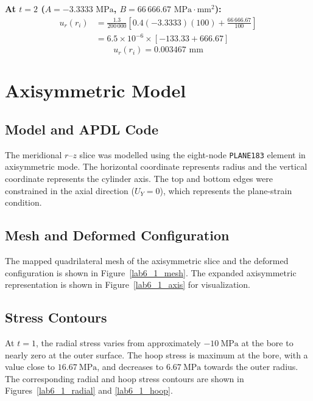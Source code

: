 \textbf{At $t = 2$ ($A = -3.3333\text{ MPa}$, $B = 66\,666.67\text{ MPa}\cdot\text{mm}^2$):}
    \begin{align*}
    u_r(r_i) &= \frac{1.3}{200\,000} \left[ 0.4(-3.3333)(100) + \frac{66\,666.67}{100} \right] \\
             &= 6.5 \times 10^{-6} \times [-133.33 + 666.67] 
    \end{align*}
    \[\boxed{u_r(r_i)  = {0.003467\text{ mm}}}\]

\section{Axisymmetric Model}

\subsection{Model and APDL Code}

The meridional $r$--$z$ slice was modelled using the eight-node
\texttt{PLANE183} element in axisymmetric mode.  The horizontal coordinate
represents radius and the vertical coordinate represents the cylinder axis.
The top and bottom edges were constrained in the axial direction
($U_Y=0$), which represents the plane-strain condition.



\subsection{Mesh and Deformed Configuration}

The mapped quadrilateral mesh of the axisymmetric slice and the deformed configuration is shown in
Figure~\ref{lab6_1_mesh}.  The expanded axisymmetric representation is shown
in Figure~\ref{lab6_1_axis} for visualization.

\subsection{Stress Contours}

At $t=1$, the radial stress varies from approximately
$-\SI{10}{\mega\pascal}$ at the bore to nearly zero at the outer surface.
The hoop stress is maximum at the bore, with a value close to
$\SI{16.67}{\mega\pascal}$, and decreases to $\SI{6.67}{\mega\pascal}$ towards the outer radius.
The corresponding radial and hoop stress contours are shown in
Figures~\ref{lab6_1_radial} and \ref{lab6_1_hoop}.

